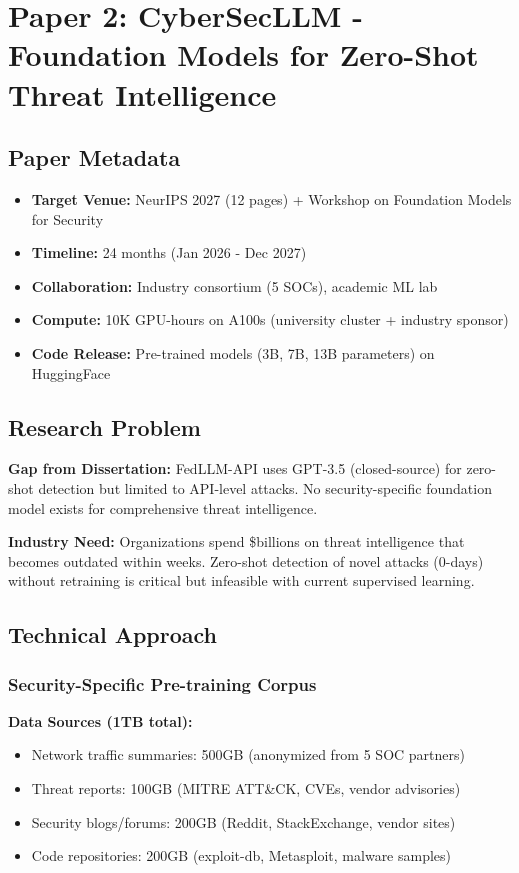 \documentclass[11pt,letterpaper]{article}
\begin{document}
\newpage

\section{Paper 2: CyberSecLLM - Foundation Models for Zero-Shot Threat Intelligence}

\subsection{Paper Metadata}

\begin{itemize}[leftmargin=2em]
\item \textbf{Target Venue:} NeurIPS 2027 (12 pages) + Workshop on Foundation Models for Security
\item \textbf{Timeline:} 24 months (Jan 2026 - Dec 2027)
\item \textbf{Collaboration:} Industry consortium (5 SOCs), academic ML lab
\item \textbf{Compute:} 10K GPU-hours on A100s (university cluster + industry sponsor)
\item \textbf{Code Release:} Pre-trained models (3B, 7B, 13B parameters) on HuggingFace
\end{itemize}

\subsection{Research Problem}

\textbf{Gap from Dissertation:} FedLLM-API uses GPT-3.5 (closed-source) for zero-shot detection but limited to API-level attacks. No security-specific foundation model exists for comprehensive threat intelligence.

\textbf{Industry Need:} Organizations spend \$billions on threat intelligence that becomes outdated within weeks. Zero-shot detection of novel attacks (0-days) without retraining is critical but infeasible with current supervised learning.

\subsection{Technical Approach}

\subsubsection{Security-Specific Pre-training Corpus}

\textbf{Data Sources (1TB total):}
\begin{itemize}
\item Network traffic summaries: 500GB (anonymized from 5 SOC partners)
\item Threat reports: 100GB (MITRE ATT\&CK, CVEs, vendor advisories)
\item Security blogs/forums: 200GB (Reddit, StackExchange, vendor sites)
\item Code repositories: 200GB (exploit-db, Metasploit, malware samples)
\end{itemize}
\end{document}
